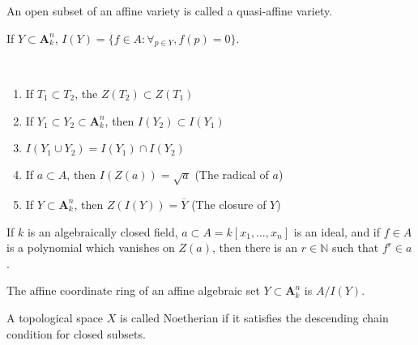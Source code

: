 \documentclass[crop=false,class=article,oneside]{standalone}
\begin{document}
            \begin{definition}
                An open subset of an affine variety
                is called a quasi-affine variety.
            \end{definition}
            \begin{notation}
                If $Y\subset\textbf{A}_{k}^{n}$,
                $I(Y)=\{f\in A:\forall_{p\in Y},f(p)=0\}$.
            \end{notation}
            \begin{theorem}
                \
                \begin{enumerate}
                    \item If $T_1\subset T_2$,
                          the $Z(T_2)\subset{Z}(T_1)$
                    \item If
                          $Y_{1}\subset{Y_{2}}\subset%
                          \textbf{A}_{k}^{n}$,
                          then $I(Y_{2})\subset{I}(Y_{1})$
                    \item $I(Y_{1}\cup{Y_{2}})%
                           =I(Y_{1})\cap{I}(Y_{2})$
                    \item If $a\subset A$,
                          then $I(Z(a))=\sqrt{a}$
                          (The radical of $a$)
                    \item If $Y\subset\textbf{A}_{k}^{n}$,
                          then $Z(I(Y))=\overline{Y}$
                          (The closure of $Y$)
                \end{enumerate}
            \end{theorem}
            \begin{theorem}
                If $k$ is an algebraically closed field,
                $a\subset{A}=k[x_{1},\hdots,x_{n}]$
                is an ideal, and if $f\in{A}$ is a polynomial
                which vanishes on $Z(a)$, then there is an
                $r\in\mathbb{N}$ such that $f^{r}\in{a}$.
            \end{theorem}
            \begin{definition}
                The affine coordinate ring of an affine
                algebraic set $Y\subset\textbf{A}_{k}^{n}$
                is $A/I(Y)$.
            \end{definition}
            \begin{definition}
                A topological space $X$ is called Noetherian
                if it satisfies the descending chain condition
                for closed subsets.
            \end{definition}
\end{document}
